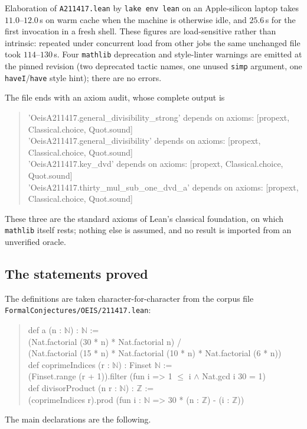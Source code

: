 \documentclass[11pt]{article}
\theoremstyle{plain}
\theoremstyle{definition}
\theoremstyle{remark}
\numberwithin{equation}{section}
\newcommand{\N}{\mathbb{N}}
\newcommand{\Z}{\mathbb{Z}}
\begin{document}
Elaboration of \texttt{A211417.lean} by \texttt{lake env lean} on an Apple-silicon laptop takes
$11.0$--$12.0$\,s on warm cache when the machine is otherwise idle, and $25.6$\,s for the first
invocation in a fresh shell. These figures are load-sensitive rather than intrinsic: repeated
under concurrent load from other jobs the same unchanged file took $114$--$130$\,s. Four
\texttt{mathlib} deprecation and style-linter warnings are emitted at the pinned revision (two
deprecated tactic names, one unused \texttt{simp} argument, one \texttt{haveI}/\texttt{have} style
hint); there are no errors.

The file ends with an axiom audit, whose complete output is
\begin{quote}\ttfamily\small
\begin{tabbing}
'OeisA211417.general\_divisibility\_strong' depends on axioms: [propext, Classical.choice, Quot.sound]\\
'OeisA211417.general\_divisibility' depends on axioms: [propext, Classical.choice, Quot.sound]\\
'OeisA211417.key\_dvd' depends on axioms: [propext, Classical.choice, Quot.sound]\\
'OeisA211417.thirty\_mul\_sub\_one\_dvd\_a' depends on axioms: [propext, Classical.choice, Quot.sound]
\end{tabbing}
\end{quote}
These three are the standard axioms of Lean's classical foundation, on which \texttt{mathlib}
itself rests; nothing else is assumed, and no result is imported from an unverified oracle.

\subsection{The statements proved}

The definitions are taken character-for-character from the corpus file
\texttt{FormalConjectures/OEIS/211417.lean}:
\begin{quote}\ttfamily\small
def a (n : $\N$) : $\N$ :=\\
\hspace*{2em}(Nat.factorial (30 * n) * Nat.factorial n) /\\
\hspace*{2em}(Nat.factorial (15 * n) * Nat.factorial (10 * n) * Nat.factorial (6 * n))\\[2pt]
def coprimeIndices (r : $\N$) : Finset $\N$ :=\\
\hspace*{2em}(Finset.range (r + 1)).filter (fun i => 1 $\le$ i $\wedge$ Nat.gcd i 30 = 1)\\[2pt]
def divisorProduct (n r : $\N$) : $\Z$ :=\\
\hspace*{2em}(coprimeIndices r).prod (fun i : $\N$ => 30 * (n : $\Z$) - (i : $\Z$))
\end{quote}
The main declarations are the following.
\end{document}
